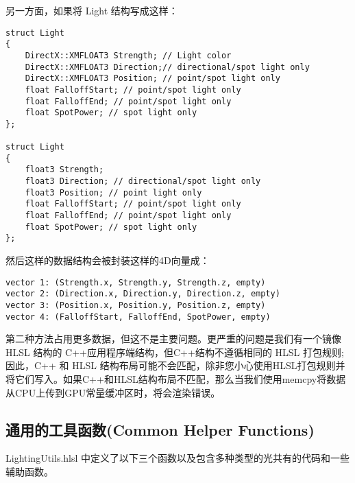 \begin{flushleft}
另一方面，如果将 Light 结构写成这样：\\
\end{flushleft}

\begin{lstlisting}
struct Light
{
    DirectX::XMFLOAT3 Strength; // Light color
    DirectX::XMFLOAT3 Direction;// directional/spot light only
    DirectX::XMFLOAT3 Position; // point/spot light only
    float FalloffStart; // point/spot light only
    float FalloffEnd; // point/spot light only
    float SpotPower; // spot light only
};

struct Light
{
    float3 Strength;
    float3 Direction; // directional/spot light only
    float3 Position; // point light only
    float FalloffStart; // point/spot light only
    float FalloffEnd; // point/spot light only
    float SpotPower; // spot light only
};
\end{lstlisting}

\begin{flushleft}
然后这样的数据结构会被封装这样的4D向量成：\\
\end{flushleft}

\begin{lstlisting}
vector 1: (Strength.x, Strength.y, Strength.z, empty)
vector 2: (Direction.x, Direction.y, Direction.z, empty)
vector 3: (Position.x, Position.y, Position.z, empty)
vector 4: (FalloffStart, FalloffEnd, SpotPower, empty)
\end{lstlisting}

\begin{flushleft}
第二种方法占用更多数据，但这不是主要问题。更严重的问题是我们有一个镜像 HLSL 结构的 C++应用程序端结构，但C++结构不遵循相同的 HLSL 打包规则; 因此，C++ 和 HLSL 结构布局可能不会匹配，除非您小心使用HLSL打包规则并将它们写入。如果C++和HLSL结构布局不匹配，那么当我们使用memcpy将数据从CPU上传到GPU常量缓冲区时，将会渲染错误。
\end{flushleft}

\subsection{通用的工具函数(Common Helper Functions)}
\begin{flushleft}
LightingUtils.hlsl 中定义了以下三个函数以及包含多种类型的光共有的代码和一些辅助函数。\\
\end{flushleft}

